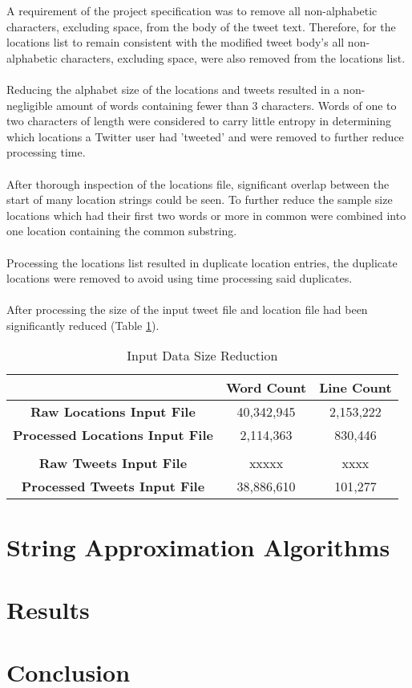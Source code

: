 \documentclass[11pt,a4paper]{article}
\begin{document}
A requirement of the project specification was to remove all non-alphabetic characters, excluding space, from the body of the tweet text. Therefore, for the locations list to remain consistent with the modified tweet body's all non-alphabetic characters, excluding space, were also removed from the locations list. \\\\
Reducing the alphabet size of the locations and tweets resulted in a non-negligible amount of words containing fewer than 3 characters. Words of one to two characters of length were considered to carry little entropy in determining which locations a Twitter user had 'tweeted' and were removed to further reduce processing time. \\\\
After thorough inspection of the locations file, significant overlap between the start of many location strings could be seen. To further reduce the sample size locations which had their first two words or more in common were combined into one location containing the common substring.\\\\       
Processing the locations list resulted in duplicate location entries, the duplicate locations were removed to avoid using time processing said duplicates.\\\\
After processing the size of the input tweet file and location file had been significantly reduced (Table \ref{table:input-table}).

\begin{table} [th]
\caption{Input Data Size Reduction}
\begin{center}
	\begin{tabular}{| c | c | c |}
	\hline
	 &  \textbf{Word Count} & \textbf{Line Count}\\
	\hline
	\textbf{Raw Locations Input File} & 40,342,945 & 2,153,222\\
	\hline
	\textbf{Processed Locations Input File} & 2,114,363 & 830,446\\
	\hline
	 &  & \\
	\hline
	\textbf{Raw Tweets Input File} & xxxxx & xxxx\\
	\hline
	\textbf{Processed Tweets Input File} & 38,886,610 & 101,277\\
	\hline
	\end{tabular}
\end{center}
\label{table:input-table}
\end{table}

\section{String Approximation Algorithms}

\section{Results}

\section{Conclusion}
\end{document}
